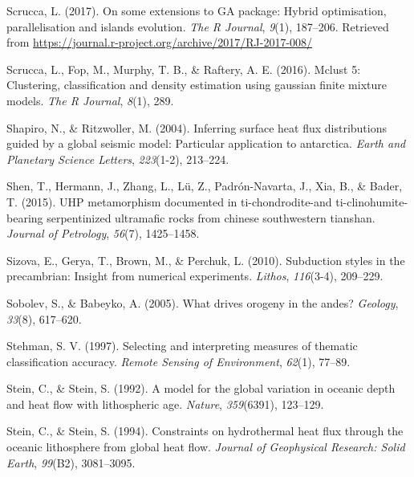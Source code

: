 \begin{CSLReferences}{1}{1}
\leavevmode{}%
Scrucca, L. (2017). On some extensions to {GA} package: Hybrid optimisation, parallelisation and islands evolution. \emph{The R Journal}, \emph{9}(1), 187--206. Retrieved from \url{https://journal.r-project.org/archive/2017/RJ-2017-008/}

\leavevmode{}%
Scrucca, L., Fop, M., Murphy, T. B., \& Raftery, A. E. (2016). Mclust 5: Clustering, classification and density estimation using gaussian finite mixture models. \emph{The R Journal}, \emph{8}(1), 289.

\leavevmode{}%
Shapiro, N., \& Ritzwoller, M. (2004). Inferring surface heat flux distributions guided by a global seismic model: Particular application to antarctica. \emph{Earth and Planetary Science Letters}, \emph{223}(1-2), 213--224.

\leavevmode{}%
Shen, T., Hermann, J., Zhang, L., Lü, Z., Padrón-Navarta, J., Xia, B., \& Bader, T. (2015). UHP metamorphism documented in ti-chondrodite-and ti-clinohumite-bearing serpentinized ultramafic rocks from chinese southwestern tianshan. \emph{Journal of Petrology}, \emph{56}(7), 1425--1458.

\leavevmode{}%
Sizova, E., Gerya, T., Brown, M., \& Perchuk, L. (2010). Subduction styles in the precambrian: Insight from numerical experiments. \emph{Lithos}, \emph{116}(3-4), 209--229.

\leavevmode{}%
Sobolev, S., \& Babeyko, A. (2005). What drives orogeny in the andes? \emph{Geology}, \emph{33}(8), 617--620.

\leavevmode{}%
Stehman, S. V. (1997). Selecting and interpreting measures of thematic classification accuracy. \emph{Remote Sensing of Environment}, \emph{62}(1), 77--89.

\leavevmode{}%
Stein, C., \& Stein, S. (1992). A model for the global variation in oceanic depth and heat flow with lithospheric age. \emph{Nature}, \emph{359}(6391), 123--129.

\leavevmode{}%
Stein, C., \& Stein, S. (1994). Constraints on hydrothermal heat flux through the oceanic lithosphere from global heat flow. \emph{Journal of Geophysical Research: Solid Earth}, \emph{99}(B2), 3081--3095.


\end{CSLReferences}
